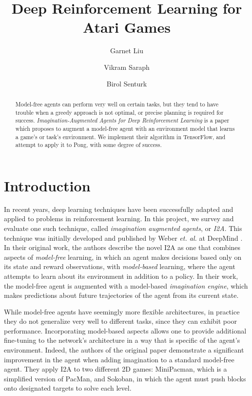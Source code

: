 \documentclass[10pt, twocolumn]{article}
\title{Deep Reinforcement Learning for Atari Games}
\author{Garnet Liu \and Vikram Saraph \and Birol Senturk}
\begin{document}
\maketitle

\begin{abstract}

Model-free agents can perform very well on certain tasks, but they tend to have trouble when a greedy approach is not optimal, or precise planning is required for success. \emph{Imagination-Augmented Agents for Deep Reinforcement Learning} is a paper which
proposes to augment a model-free agent with an environment model that learns a game's or task's environment. We implement their algorithm in TensorFlow, and attempt to apply it to Pong, with some degree of success.

\end{abstract}

\section{Introduction}

In recent years, deep learning techniques have been successfully adapted and applied to problems
in reinforcement learning. In this project, we survey and evaluate one such technique, called \emph{imagination augmented agents}, or \emph{I2A}. This technique was initially developed and published by Weber \emph{et. al.} at DeepMind \cite{I2A}. In their original
work, the authors describe the novel I2A as one that combines aspects of \emph{model-free} learning, in which an agent makes decisions based only on its state and reward observations, with \emph{model-based} learning, where the agent attempts to learn
about its environment in addition to a policy. In their work, the model-free agent is augmented with a model-based \emph{imagination engine}, which makes predictions about future trajectories of the agent from its current state.

While model-free agents have seemingly more flexible architectures, in practice they do not generalize very well to different tasks,
since they can exhibit poor performance. Incorporating model-based aspects allows one to provide additional fine-tuning to the network's architecture in a way that is specific of the 
agent's environment. Indeed, the authors of the original paper demonstrate a significant improvement in the agent when adding 
imagination to a standard model-free agent. They apply I2A to two different 2D games: MiniPacman, which is a simplified version of 
PacMan, and Sokoban, in which the agent must push blocks onto designated targets to solve each level.
\end{document}
